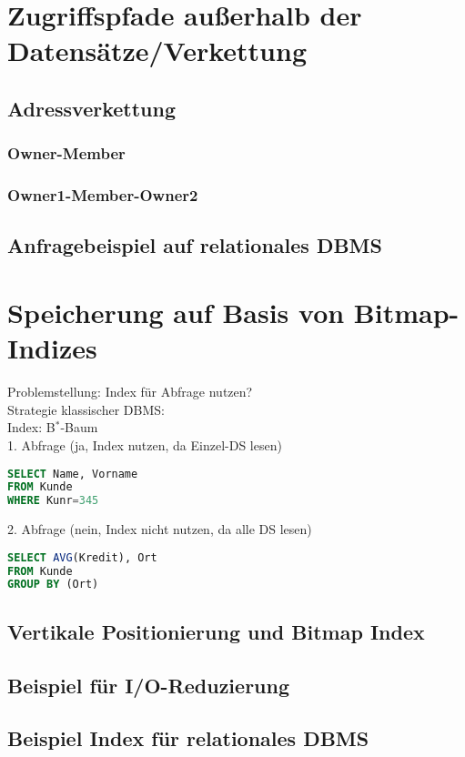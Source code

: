 \section{Zugriffspfade außerhalb der Datensätze/Verkettung}
\subsection{Adressverkettung}
\subsubsection{Owner-Member}
\subsubsection{Owner1-Member-Owner2}

\subsection{Anfragebeispiel auf relationales DBMS}

\section{Speicherung auf Basis von  Bitmap-Indizes}
Problemstellung: Index für Abfrage nutzen?\\
Strategie klassischer DBMS:\\
Index: B$^*$-Baum\\
1. Abfrage (ja, Index nutzen, da Einzel-DS lesen)
\begin{lstlisting}[language=SQL]
SELECT Name, Vorname
FROM Kunde
WHERE Kunr=345
\end{lstlisting}
2. Abfrage (nein, Index nicht nutzen, da alle DS lesen)
\begin{lstlisting}[language=SQL]
SELECT AVG(Kredit), Ort
FROM Kunde
GROUP BY (Ort)
\end{lstlisting}
\subsection{Vertikale Positionierung und Bitmap Index}
\subsection{Beispiel für I/O-Reduzierung}

\subsection{Beispiel Index für relationales DBMS}

